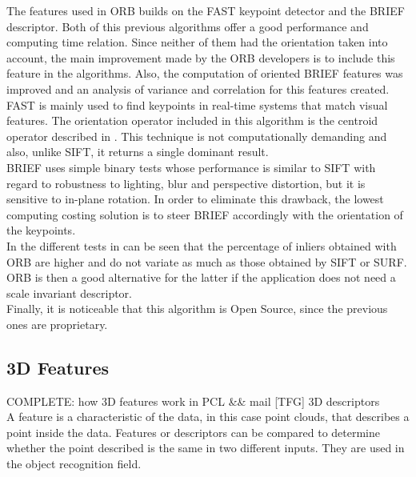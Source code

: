 The features used in ORB builds on the FAST\cite{fast} keypoint detector and the BRIEF\cite{brief} descriptor. Both of this previous algorithms offer a good performance and computing time relation. Since neither of them had the orientation taken into account, the main improvement made by the ORB developers is to include this feature in the algorithms. Also, the computation of oriented BRIEF features was improved and an analysis of variance and correlation for this features created. 
\\

FAST is mainly used to find keypoints in real-time systems that match visual features. The orientation operator included in this algorithm is the centroid operator described in \cite{orientation_corners}. This technique is not computationally demanding and also, unlike SIFT, it returns a single dominant result. 
\\

BRIEF uses simple binary tests whose performance is similar to SIFT with regard to robustness to lighting, blur and perspective distortion, but it is sensitive to in-plane rotation. In order to eliminate this drawback, the lowest computing costing solution is to steer BRIEF accordingly with the orientation of the keypoints. 
\\

In the different tests in \cite{orb} can be seen that the percentage of inliers obtained with ORB are higher and do not variate as much as those obtained by SIFT or SURF. 
ORB is then a good alternative for the latter if the application does not need a scale invariant descriptor. 
\\

Finally, it is noticeable that this algorithm is Open Source, since the previous ones are proprietary. 


\subsection{3D Features}
\label{3d_features}

COMPLETE: how 3D features work in PCL  &&  mail [TFG] 3D descriptors
\\

A feature is a characteristic of the data, in this case point clouds, that describes a point inside the data. Features or descriptors can be compared to determine whether the point described is the same in two different inputs. They are used in the object recognition field. 
\\

